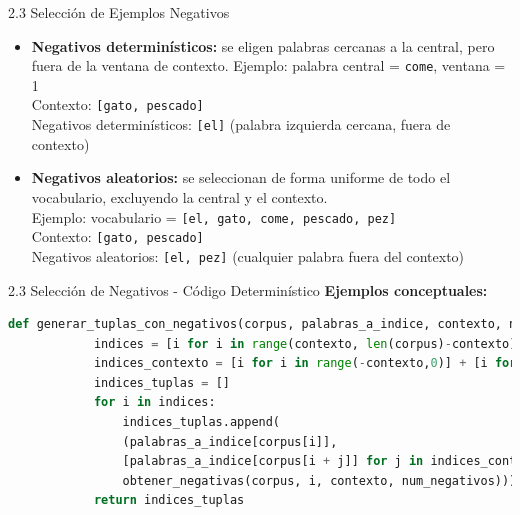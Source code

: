 \documentclass{beamer}
\begin{document}
\begin{frame}{2.3 Selección de Ejemplos Negativos}
	\justifying
	
	\begin{itemize}
		\item \textbf{Negativos determinísticos:} se eligen palabras cercanas a la central, pero fuera de la ventana de contexto.  
		Ejemplo: palabra central = \texttt{come}, ventana = 1 \\
		Contexto: \texttt{[gato, pescado]} \\
		Negativos determinísticos: \texttt{[el]} (palabra izquierda cercana, fuera de contexto)
		
		\item \textbf{Negativos aleatorios:} se seleccionan de forma uniforme de todo el vocabulario, excluyendo la central y el contexto. \\
		Ejemplo: vocabulario = \texttt{[el, gato, come, pescado, pez]} \\
		Contexto: \texttt{[gato, pescado]} \\
		Negativos aleatorios: \texttt{[el, pez]} (cualquier palabra fuera del contexto)
	\end{itemize}
	
\end{frame}





\begin{frame}[fragile]{2.3 Selección de Negativos - Código Determinístico}
	\textbf{Ejemplos conceptuales:}
	\begin{block}{}
		\begin{lstlisting}[language=Python]
def generar_tuplas_con_negativos(corpus, palabras_a_indice, contexto, num_negativos):
			indices = [i for i in range(contexto, len(corpus)-contexto)]
			indices_contexto = [i for i in range(-contexto,0)] + [i for i in range(1,contexto+1)]
			indices_tuplas = []
			for i in indices:
				indices_tuplas.append(
				(palabras_a_indice[corpus[i]],
				[palabras_a_indice[corpus[i + j]] for j in indices_contexto],
				obtener_negativas(corpus, i, contexto, num_negativos)))
			return indices_tuplas
			
		\end{lstlisting}
	\end{block}
\end{frame}
\end{document}
